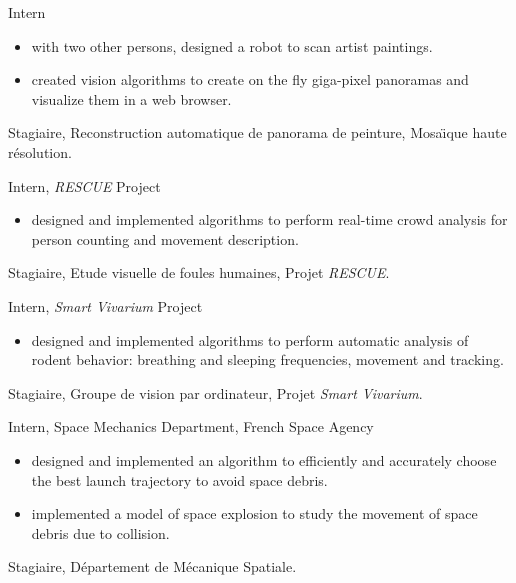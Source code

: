 \documentclass{article}
\begin{document}
\begin{llist}
{
Intern
\vspace{-0.33cm}
\begin{itemize}
 \item with two other persons, designed a robot to scan artist paintings.
 \item created vision algorithms to create on the fly giga-pixel panoramas and visualize them in a web browser.
\end{itemize}
}
{
Stagiaire, Reconstruction automatique de panorama de peinture, Mosa\"{\i}que haute r\'{e}solution.
}

{
Intern, {\em RESCUE} Project
\vspace{-0.33cm}
\begin{itemize}
 \item designed and implemented algorithms to perform real-time crowd analysis for person counting and movement 
description.
\end{itemize}
}
{
Stagiaire, Etude visuelle de foules humaines, Projet {\em RESCUE}.
}

{
Intern, {\em Smart Vivarium} Project
\vspace{-0.33cm}
\begin{itemize}
 \item designed and implemented algorithms to perform automatic analysis of rodent behavior: breathing and sleeping 
frequencies, movement and tracking.
\end{itemize}
}
{
Stagiaire, Groupe de vision par ordinateur, Projet {\em Smart Vivarium}.
}

{
Intern, Space Mechanics Department, French Space Agency
\vspace{-0.33cm}
\begin{itemize}
 \item designed and implemented an algorithm to efficiently and accurately choose the best launch trajectory 
to avoid space debris.
 \item implemented a model of space explosion to study the movement of space debris due to collision.
\end{itemize}
}
{
Stagiaire, D\'{e}partement de M\'{e}canique Spatiale.
}


\end{llist}
\end{document}
